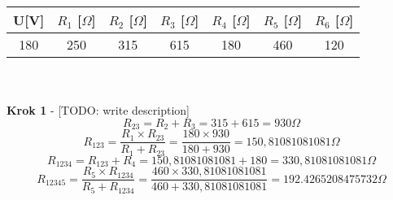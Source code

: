 \documentclass{article}
\begin{document}
\begin{tabular}{| c | c | c | c | c | c | c |}
  \hline
   U[V] & $R_{1}$ [$\Omega$] & $R_{2}$ [$\Omega$]& $R_{3}$ [$\Omega$]& $R_{4}$ [$\Omega$]& $R_{5}$ [$\Omega$]& $R_{6}$ [$\Omega$]\\
  \hline
  180 & 250 & 315 & 615 & 180 & 460 & 120\\
  \hline
\end{tabular}\\
\\
\textbf{Krok 1} - [TODO: write description]\\
\[
  R_{23} = R_{2} + R_{3} = 315 + 615 = 930 \Omega
\]
\[
  R_{123} = \displaystyle\frac{R_{1} \times R_{23}}{R_{1} + R_{23}}=\displaystyle\frac{180 \times 930}{180 + 930} = 150,81081081081 \Omega 
\]
\[
  R_{1234} = R_{123} + R_{4} = 150,81081081081 + 180 = 330,81081081081 \Omega
\]
\[
  R_{12345} = \displaystyle\frac{R_{5} \times R_{1234}}{R_{5} + R_{1234}} = \displaystyle\frac{460 \times 330,81081081081}{460 + 330,81081081081} = 192.4265208475732 \Omega
\]
\end{document}
